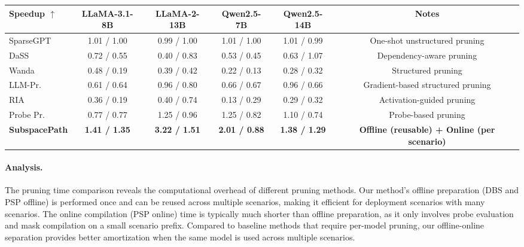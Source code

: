 \begin{table}[!t]
\begin{tabular}{l c c c c c}
\midrule
\textbf{Speedup $\uparrow$} & \textbf{LLaMA-3.1-8B} & \textbf{LLaMA-2-13B} & \textbf{Qwen2.5-7B} & \textbf{Qwen2.5-14B} & \textbf{Notes} \\
\midrule
SparseGPT & 1.01 / 1.00 & 0.99 / 1.00 & 1.01  / 1.00 & 1.01 / 0.99 & One-shot unstructured pruning \\
DaSS & 0.72 / 0.55 & 0.40 / 0.83 & 0.53 / 0.45 & 0.63 / 1.07 & Dependency-aware pruning \\
Wanda & 0.48 / 0.19 & 0.39 / 0.42 & 0.22 / 0.13 & 0.28 / 0.32 & Structured pruning \\
LLM-Pr. & 0.61 / 0.64 & 0.96 / 0.80 & 0.66 / 0.67 & 0.96 / 0.66 & Gradient-based structured pruning \\
RIA & 0.36 / 0.19 & 0.40 / 0.74 & 0.13 / 0.29 & 0.29 / 0.32 & Activation-guided pruning \\
Probe Pr. & 0.77 / 0.77 & 1.25 / 0.96 & 1.25 / 0.82 & 1.10 / 0.74 & Probe-based pruning \\
\rowcolor{icmlblue} \textbf{SubspacePath} & \textbf{1.41 / 1.35} & \textbf{3.22 / 1.51} & \textbf{2.01 / 0.88} & \textbf{1.38 / 1.29} & \textbf{Offline (reusable) + Online (per scenario)} \\
\bottomrule
\end{tabular}
\vspace{-3mm}
\label{tab:pruning_time}
\end{table}

\paragraph{Analysis.}
The pruning time comparison reveals the computational overhead of different pruning methods.
Our method's offline preparation (DBS and PSP offline) is performed once and can be reused across multiple scenarios, making it efficient for deployment scenarios with many scenarios.
The online compilation (PSP online) time is typically much shorter than offline preparation, as it only involves probe evaluation and mask compilation on a small scenario prefix.
Compared to baseline methods that require per-model pruning, our offline-online separation provides better amortization when the same model is used across multiple scenarios.



